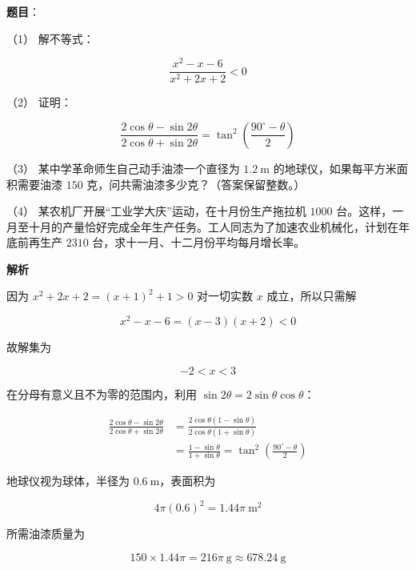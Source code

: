 \begin{answer}

\textbf{题目}：

（1） 解不等式：

\nopagebreak[4]
\[
\frac{x^2-x-6}{x^2+2x+2}<0
\]

（2） 证明：

\nopagebreak[4]
\[
\frac{2\cos\theta-\sin2\theta}{2\cos\theta+\sin2\theta}
=\tan^2\left(\frac{90^\circ-\theta}{2}\right)
\]

（3） 某中学革命师生自己动手油漆一个直径为 $1.2\ \mathrm m$ 的地球仪，如果每平方米面积需要油漆 $150$ 克，问共需油漆多少克？（答案保留整数。）

（4） 某农机厂开展“工业学大庆”运动，在十月份生产拖拉机 $1000$ 台。这样，一月至十月的产量恰好完成全年生产任务。工人同志为了加速农业机械化，计划在年底前再生产 $2310$ 台，求十一月、十二月份平均每月增长率。

\textbf{解析}


因为 $x^2+2x+2=(x+1)^2+1>0$ 对一切实数 $x$ 成立，所以只需解

\nopagebreak[4]
\[
x^2-x-6=(x-3)(x+2)<0
\]

故解集为

\nopagebreak[4]
\[
-2<x<3
\]


在分母有意义且不为零的范围内，利用 $\sin2\theta=2\sin\theta\cos\theta$：

\nopagebreak[4]
\[
\begin{aligned}
\frac{2\cos\theta-\sin2\theta}{2\cos\theta+\sin2\theta}
&=\frac{2\cos\theta(1-\sin\theta)}{2\cos\theta(1+\sin\theta)}\\
&=\frac{1-\sin\theta}{1+\sin\theta}
=\tan^2\left(\frac{90^\circ-\theta}{2}\right)
\end{aligned}
\]


地球仪视为球体，半径为 $0.6\ \mathrm m$，表面积为

\nopagebreak[4]
\[
4\pi(0.6)^2=1.44\pi\ \mathrm{m^2}
\]

所需油漆质量为

\nopagebreak[4]
\[
150\times1.44\pi=216\pi\ \mathrm g\approx678.24\ \mathrm g
\]


\end{answer}
